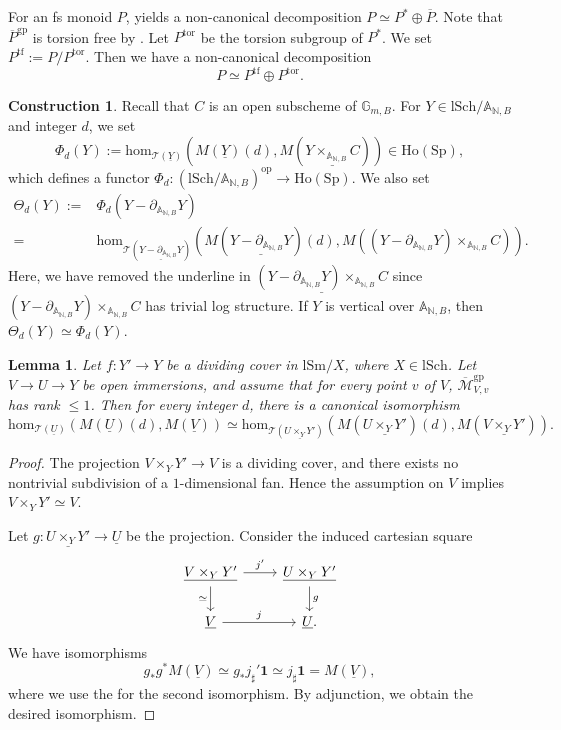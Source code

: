 \documentclass[10pt]{amsart}
\newtheorem{lem}[thm]{Lemma}
\theoremstyle{definition}
\newtheorem{const}[thm]{Construction}
\theoremstyle{remark}
\numberwithin{equation}{subsection}
\newcommand{\A}{\mathbb{A}}
\newcommand{\G}{\mathbb{G}}
\newcommand{\N}{\mathbb{N}}
\newcommand{\cM}{\mathcal{M}}
\newcommand{\sT}{\mathscr{T}}
\newcommand{\ul}{\underline}
\newcommand{\ol}{\overline}
\newcommand{\Spt}{\mathrm{Sp}}
\newcommand{\Ho}{\mathrm{Ho}}
\newcommand{\tor}{\mathrm{tor}}
\newcommand{\tf}{\mathrm{tf}}
\newcommand{\map}{\mathrm{hom}}
\newcommand{\lSch}{\mathrm{lSch}}
\newcommand{\lSm}{\mathrm{lSm}}
\newcommand{\op}{\mathrm{op}}
\newcommand{\gp}{\mathrm{gp}}
\newcommand{\unit}{\mathbf{1}}
\begin{document}
For an fs monoid $P$,
\cite[Lemma I.6.7]{zbMATH07027475} yields a non-canonical decomposition $P\simeq P^*\oplus \ol{P}$.
Note that $\ol{P}^\gp$ is torsion free by \cite[Proposition I.1.3.5(2)]{Ogu}.
Let $P^\tor$ be the torsion subgroup of $P^*$.
We set $P^\tf:=P/P^\tor$.
Then we have a non-canonical decomposition
\begin{equation}
P
\simeq
P^\tf \oplus P^\tor.
\end{equation}



\begin{const}
\label{lemma.11}
Recall that $C$ is an open subscheme of $\G_{m,B}$.
For $Y\in \lSch/\A_{\N,B}$ and integer $d$, we set
\[
\Phi_d(Y)
:=
\map_{\sT(\ul{Y})}
(M(\ul{Y})(d),M(\ul{Y\times_{\A_{\N,B}}C}))
\in
\Ho(\Spt),
\]
which defines a functor $\Phi_d \colon (\lSch/\A_{\N,B})^{\op}\to \Ho(\Spt)$.
We also set
\begin{align*}
\Theta_d(Y)
:=
&\Phi_d(Y-\partial_{\A_{\N,B}}Y)
\\
=
&\map_{\sT(\ul{Y-\partial_{\A_{\N,B}}Y})}
(M(\ul{Y-\partial_{\A_{\N,B}}Y})(d),M((Y-\partial_{\A_{\N,B}}Y)\times_{\A_{\N,B}}C)).
\end{align*}
Here, we have removed the underline in $\ul{(Y-\partial_{\A_{\N,B}}Y)\times_{\A_{\N,B}}C}$ since $(Y-\partial_{\A_{\N,B}}Y)\times_{\A_{\N,B}}C$ has trivial log structure.
If $Y$ is vertical over $\A_{\N,B}$, then $\Theta_d(Y)\simeq \Phi_d(Y)$.
\end{const}


\begin{lem}
\label{lemma.10}
Let $f\colon Y'\to Y$ be a dividing cover in $\lSm/X$,
where $X\in \lSch$.
Let $V\to U\to Y$ be open immersions, and assume that for every point $v$ of $V$,
$\ol{\cM}_{V,v}^\gp$ has rank $\leq 1$.
Then for every integer $d$,
there is a canonical isomorphism
\[
\map_{\sT(\ul{U})}
(M(\ul{U})(d),M(\ul{V}))
\simeq
\map_{\sT(\ul{U\times_Y Y'})}
(M(\ul{U\times_Y Y'})(d),M(\ul{V\times_Y Y'})).
\]
\end{lem}
\begin{proof}
The projection $V\times_Y Y'\to V$ is a dividing cover,
and there exists no nontrivial subdivision of a $1$-dimensional fan.
Hence the assumption on $V$ implies $V\times_Y Y'\simeq V$.

Let $g\colon \ul{U\times_Y Y'}\to \ul{U}$ be the projection.
Consider the induced cartesian square
\[
\begin{tikzcd}
\ul{V\times_Y Y'}\ar[d,"\simeq"']\ar[r,"j'"]&
\ul{U\times_Y Y'}\ar[d,"g"]
\\
\ul{V}\ar[r,"j"]&
\ul{U}.
\end{tikzcd}
\]
We have isomorphisms
\[
g_*g^*M(\ul{V})
\simeq
g_*j_\sharp' \unit
\simeq
j_\sharp \unit
=
M(\ul{V}),
\]
where we use the \cite[Theorem 2.4.50(2)]{CD19} for the second isomorphism.
By adjunction, we obtain the desired isomorphism.
\end{proof}
\end{document}
